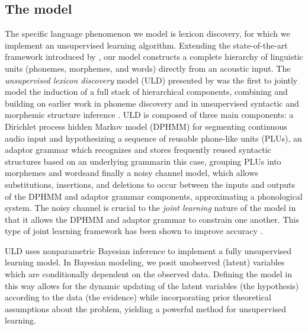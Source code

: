 \documentclass[12pt,letterpaper]{article}
\begin{document}
\subsection{The model}
The specific language phenomenon we model is lexicon discovery, for which we implement an unsupervised learning algorithm. Extending the state-of-the-art framework introduced by \citet{lee:2015}, our model constructs a complete hierarchy of linguistic units (phonemes, morphemes, and words) directly from an acoustic input. The \textit{unsupervised lexicon discovery} model (ULD) presented by \citet{lee:2015} was the first to jointly model the induction of a full stack of hierarchical components, combining and building on earlier work in phoneme discovery \citep{lee:2012} and in unsupervised syntactic and morphemic structure inference \citep{johnson:2007, odonnell:2015} . ULD is composed of three main components: a Dirichlet process hidden Markov model (DPHMM) for segmenting continuous audio input and hypothesizing a sequence of reusable phone-like units (PLUs), an adaptor grammar which recognizes and stores frequently reused syntactic structures based on an underlying grammar\textemdash in this case, grouping PLUs into morphemes and words\textemdash and finally a noisy channel model, which allows substitutions, insertions, and deletions to occur between the inputs and outputs of the DPHMM and adaptor grammar components, approximating a phonological system. The noisy channel is crucial to the \textit{joint learning} nature of the model in that it allows the DPHMM and adaptor grammar to constrain one another. This type of joint learning framework has been shown to improve accuracy \citep{johnson:2008}. 

ULD uses nonparametric Bayesian inference to implement a fully unsupervised learning model. In Bayesian modeling, we posit unobserved (latent) variables which are conditionally dependent on the observed data. Defining the model in this way allows for the dynamic updating of the latent variables (the hypothesis) according to the data (the evidence) while incorporating prior theoretical assumptions about the problem, yielding a powerful method for unsupervised learning. 
\end{document}
